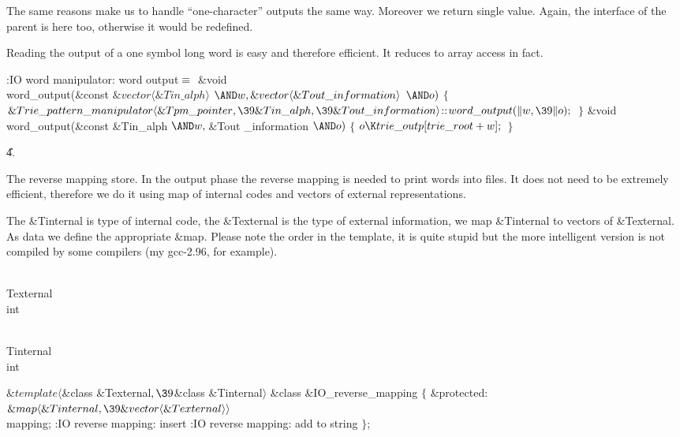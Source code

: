 The same reasons make us to handle ``one-character'' outputs the same
way. Moreover we return single value. Again, the interface of the parent
is here too, otherwise it would be redefined.

Reading the output of a one symbol long word is easy and therefore
efficient. It reduces to array access in fact.

\Y\B\4:IO word manipulator: word output\X${}\equiv{}$\6
\&{void} \\{word\_output}(\&{const} ${}\&{vector}\langle\&{Tin\_alph}\rangle{}$
${}{\AND}\|w,\39\&{vector}\langle\&{Tout\_information}\rangle{}$ ${}{\AND}%
\|o){}$\1\1\2\2\6
${}\{{}$\1\6
${}\&{Trie\_pattern\_manipulator}\langle\&{Tpm\_pointer},\39\&{Tin\_alph},\39%
\&{Tout\_information}\rangle\DC\\{word\_output}(\|w,\39\|o);{}$\6
\4${}\}{}$\2\7
\&{void} \\{word\_output}(\&{const} \&{Tin\_alph} ${}{\AND}\|w,\39{}$\&{Tout%
\_information} ${}{\AND}\|o){}$\1\1\2\2\6
${}\{{}$\1\6
${}\|o\K\\{trie\_outp}[\\{trie\_root}+\|w];{}$\6
\4${}\}{}$\2\par
\U4.\fi

The reverse mapping store. In the output phase the reverse mapping is
needed to print words into files.
It does not need to be extremely efficient, therefore we do it
using map of internal codes and vectors of external representations.

The \&{Tinternal} is type of internal code, the \&{Texternal} is the type of
external information, we map \&{Tinternal} to vectors of \&{Texternal}.
As data we define the appropriate \&{map}. Please note the order in the
template, it is quite stupid but the more intelligent version is not
compiled by some compilers (my gcc-2.96, for example).

\Y\B\F\\{Texternal} \5
\\{int}\par
\B\F\\{Tinternal} \5
\\{int}\par
\Y\B$\&{template}\langle{}$\&{class} \&{Texternal}${},\39{}$\&{class} %
\&{Tinternal}${}\rangle{}$\6
\&{class} \&{IO\_reverse\_mapping} ${}\{{}$\1\6
\4\&{protected}:\6
${}\&{map}\langle\&{Tinternal},\39\&{vector}\langle\&{Texternal}\rangle%
\rangle{}$ \\{mapping};\7
:IO reverse mapping: insert\X\6
:IO reverse mapping: add to string\X\2\6
${}\}{}$;\par
\fi

